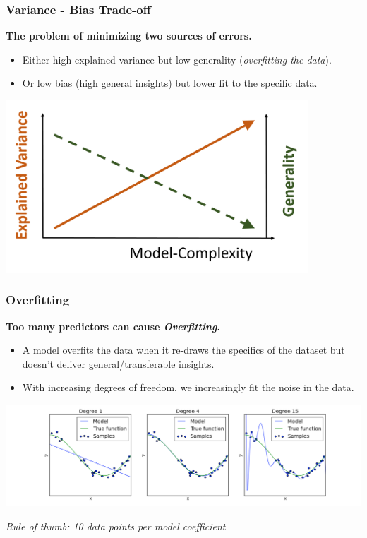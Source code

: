 \documentclass{beamer}
\begin{document}
\begin{frame}
  \frametitle{Variance - Bias Trade-off}
  \textbf{The problem of minimizing two sources of errors.}
  
  \begin{itemize}
    \item Either high explained variance but low generality (\textit{overfitting the data}).
    \item Or low bias (high general insights) but lower fit to the specific data.
  \end{itemize}
  
  \begin{center}
    \includegraphics[width=0.85\textwidth]{figures/var-bias-tradeoff.png} 
  \end{center}
\end{frame}

\begin{frame}
  \frametitle{Overfitting}
  \textbf{Too many predictors can cause \textit{Overfitting}.}
  
  \begin{itemize}
    \item A model overfits the data when it re-draws the specifics of the dataset but doesn't deliver general/transferable insights.
    \item With increasing degrees of freedom, we increasingly fit the noise in the data.
  \end{itemize}
  \vspace{0.5cm}
        
    \centering\includegraphics[width=1\textwidth]{lectures/day_3_LM_refresh_II/figures/overfitting.png}
    \vspace{0.5cm}

    \textit{Rule of thumb: 10 data points per model coefficient}
\end{frame}
\end{document}
